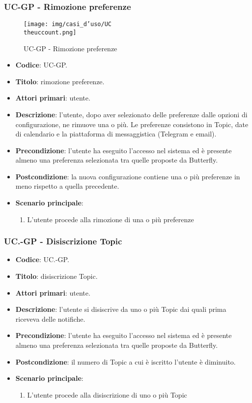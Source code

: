 \subsubsection{UC\theuccount-GP - Rimozione preferenze}
		\begin{figure}[H]
			\centering
				\texttt{[image: img/casi\_d'uso/UC\\theuccount.png]}\\
			\caption{UC\theuccount-GP - Rimozione preferenze}
		\end{figure}
	\begin{itemize}
		\item \textbf{Codice}: UC\theuccount-GP.
		\item \textbf{Titolo}: rimozione preferenze.
		\item \textbf{Attori primari}: utente.
		\item \textbf{Descrizione}: l’utente, dopo aver selezionato delle preferenze dalle opzioni di configurazione, ne rimuove una o più. Le preferenze consistono in Topic, date di calendario e la piattaforma di messaggistica (Telegram e email).
		\item \textbf{Precondizione}: l’utente ha eseguito l'accesso nel sistema ed è presente almeno
        una preferenza selezionata tra quelle proposte da Butterfly.
		\item \textbf{Postcondizione}: la nuova configurazione contiene una o più preferenze in meno rispetto a quella precedente.
		\item \textbf{Scenario principale}:
		\begin{enumerate}
			\item L'utente procede alla rimozione di una o più preferenze
		\end{enumerate}
	\end{itemize}

	\subsubsection{UC\theuccount.\thesubuccount-GP - Disiscrizione Topic}

		\begin{itemize}
			\item \textbf{Codice}: UC\theuccount.\thesubuccount-GP.
			\item \textbf{Titolo}: disiscrizione Topic.
			\item \textbf{Attori primari}: utente.
			\item \textbf{Descrizione}: l’utente si disiscrive da uno o più Topic dai quali prima riceveva delle notifiche.
			\item \textbf{Precondizione}: l’utente ha eseguito l'accesso nel sistema ed è presente almeno
            una preferenza selezionata tra quelle proposte da Butterfly.
			\item \textbf{Postcondizione}: il numero di Topic a cui è iscritto l’utente è diminuito.
			\item \textbf{Scenario principale}:
			\begin{enumerate}
				\item L'utente procede alla disiscrizione di uno o più Topic
			\end{enumerate}
		\end{itemize}

